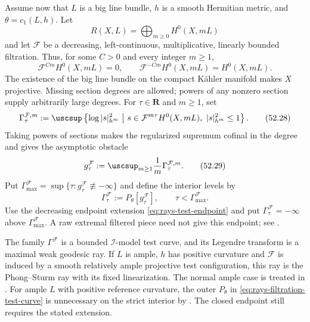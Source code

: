 Assume now that $L$ is a big line bundle, $h$ is a smooth Hermitian metric, and
$\theta=c_1(L,h)$.  Let
\[
 R(X,L)=\bigoplus_{m\geq0}H^0(X,mL)
\]
and let $\mathcal F$ be a decreasing, left-continuous,
multiplicative, linearly bounded filtration. Thus, for some $C>0$ and
every integer $m\geq1$,
\[
 \mathcal F^{Cm}H^0(X,mL)=0,\qquad
 \mathcal F^{-Cm}H^0(X,mL)=H^0(X,mL).
\tag{52.27}\label{eq:rays-linear-filtration}
\]
The existence of the big line bundle on the compact K\"ahler manifold
makes $X$ projective.  Missing section degrees are allowed; powers of
any nonzero section supply arbitrarily large degrees.
For $\tau\in\mathbf R$ and $m\geq1$, set
\[
 \Gamma_{\tau}^{\mathcal F,m}
 :=\uscsup\left\{\log|s|_{h^m}^2\ \middle|\
 s\in\mathcal F^{m\tau}H^0(X,mL),\
 |s|_{h^m}^2\leq1\right\}.
\tag{52.28}\label{eq:rays-bergman-test}
\]
Taking powers of sections makes the regularized supremum cofinal in the degree and gives the asymptotic obstacle
\[
 g_\tau^{\mathcal F}
 :=\uscsup_{m\geq1}\frac1m\Gamma_{\tau}^{\mathcal F,m}.
\tag{52.29}\label{eq:rays-filtration-obstacle}
\]
Put $\Gamma_{\max}^{\mathcal F}=\sup\{\tau:g_\tau^{\mathcal F}\not\equiv-\infty\}$ and define the interior levels by
\[
 \Gamma_\tau^{\mathcal F}:=P_\theta[g_\tau^{\mathcal F}],
                  \qquad \tau<\Gamma_{\max}^{\mathcal F}.
\tag{52.30}\label{eq:rays-filtration-test-curve}
\]
Use the decreasing endpoint extension \eqref{eq:rays-test-endpoint} and put $\Gamma_\tau^{\mathcal F}=-\infty$ above $\Gamma_{\max}^{\mathcal F}$. A raw extremal filtered piece need not give this endpoint; see .

\begin{theorem}\label{thm:rays-filtration-interface}
The family $\Gamma^{\mathcal F}$ is a bounded
$\mathcal I$-model test curve, and its Legendre transform is a maximal
weak geodesic ray. If $L$ is ample, $h$ has positive curvature and $\mathcal F$ is induced by a smooth relatively ample projective test configuration, this ray is the Phong--Sturm ray with its fixed linearization. The normal ample case is treated in . For ample $L$ with positive reference curvature, the outer $P_\theta$ in \eqref{eq:rays-filtration-test-curve} is unnecessary on the strict interior by \cite[Proposition~7.11 and Corollary~7.12]{RWN14}. The closed endpoint still requires the stated extension.
\end{theorem}

